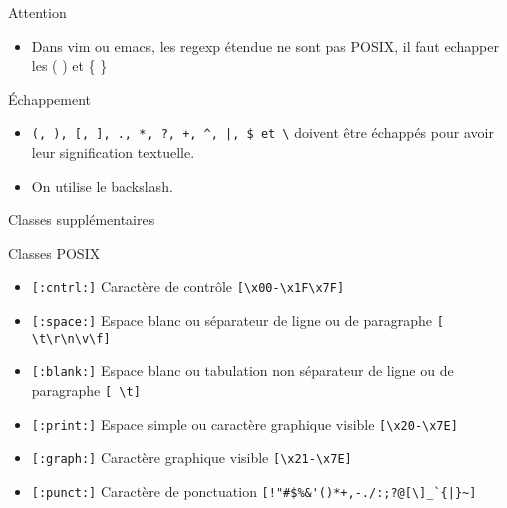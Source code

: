 \begin{frame}[containsverbatim]{\ftitle}

\def\blocktitle{Attention}
\begin{alertblock}{\blocktitle}
\begin{itemize}
\item Dans vim ou emacs, les regexp étendue ne sont pas POSIX, il faut echapper les ( )  et \{ \}
\end{itemize}
\end{alertblock}

\def\blocktitle{Échappement}
\begin{block}{\blocktitle}
\begin{itemize}
\item \verb!(, ), [, ], ., *, ?, +, ^, |, $ et \! doivent être échappés pour avoir leur signification textuelle. %
\item On utilise le backslash.
\end{itemize}
\end{block}
\end{frame}



\def\ftitle{Classes supplémentaires}
\begin{frame}[containsverbatim]{\ftitle}
\def\blocktitle{Classes POSIX}
\begin{block}{\blocktitle}
\begin{itemize}
\item \verb![:cntrl:]! 	Caractère de contrôle 	\verb![\x00-\x1F\x7F]!
\item \verb![:space:]! 	Espace blanc ou séparateur de ligne ou de paragraphe 	\verb![ \t\r\n\v\f]!
\item \verb![:blank:]! 	Espace blanc ou tabulation non séparateur de ligne ou de paragraphe 	\verb![ \t]!
\item \verb![:print:]! 	Espace simple ou caractère graphique visible 	\verb![\x20-\x7E]!
\item \verb![:graph:]! 	Caractère graphique visible 	\verb![\x21-\x7E]!
\item \verb![:punct:]! 	Caractère de ponctuation 	\verb<[!"#$%&'()*+,-./:;?@[\]_`{|}~]<
\end{itemize}
\end{block}
\end{frame}

